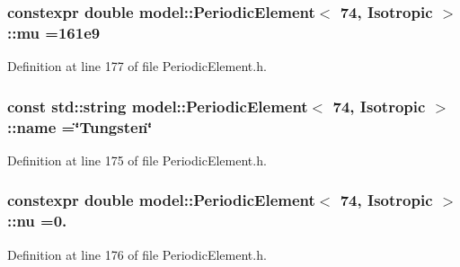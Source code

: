 \subsubsection[{mu}]{\setlength{\rightskip}{0pt plus 5cm}constexpr double {\bf model\+::\+Periodic\+Element}$<$ 74, {\bf Isotropic} $>$\+::mu =161e9\hspace{0.3cm}{\ttfamily [static]}}\label{structmodel_1_1_periodic_element_3_0174_00_01_isotropic_01_4_aebf78eba503b1b46147d6482dbd44be3}


Definition at line 177 of file Periodic\+Element.\+h.

\hypertarget{structmodel_1_1_periodic_element_3_0174_00_01_isotropic_01_4_acb9e9239a12822c9f4cd61fe321f0c50}{}
\subsubsection[{name}]{\setlength{\rightskip}{0pt plus 5cm}const std\+::string {\bf model\+::\+Periodic\+Element}$<$ 74, {\bf Isotropic} $>$\+::name =\char`\"{}Tungsten\char`\"{}\hspace{0.3cm}{\ttfamily [static]}}\label{structmodel_1_1_periodic_element_3_0174_00_01_isotropic_01_4_acb9e9239a12822c9f4cd61fe321f0c50}


Definition at line 175 of file Periodic\+Element.\+h.

\hypertarget{structmodel_1_1_periodic_element_3_0174_00_01_isotropic_01_4_ad755cbfc4e0a78381a6284997c74162a}{}
\subsubsection[{nu}]{\setlength{\rightskip}{0pt plus 5cm}constexpr double {\bf model\+::\+Periodic\+Element}$<$ 74, {\bf Isotropic} $>$\+::nu =0.\hspace{0.3cm}{\ttfamily [static]}}\label{structmodel_1_1_periodic_element_3_0174_00_01_isotropic_01_4_ad755cbfc4e0a78381a6284997c74162a}


Definition at line 176 of file Periodic\+Element.\+h.

